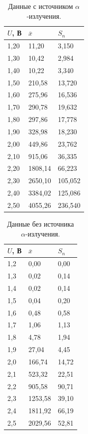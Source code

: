 \documentclass[a4paper,12pt]{article}
\begin{document}
\begin{table}[!ht]
    \centering
    \begin{tabular}{|l|l|l|}
    \hline
        $U$, В & $\overline{x}$ & $S_n$ \\ \hline
        1,20 & 11,20 & 3,150 \\ \hline
        1,30 & 10,42 & 2,984 \\ \hline
        1,40 & 10,22 & 3,340 \\ \hline
        1,50 & 210,58 & 13,720 \\ \hline
        1,60 & 275,96 & 16,536 \\ \hline
        1,70 & 290,78 & 19,632 \\ \hline
        1,80 & 297,86 & 17,778 \\ \hline
        1,90 & 328,98 & 18,230 \\ \hline
        2,00 & 449,86 & 23,762 \\ \hline
        2,10 & 915,06 & 36,335 \\ \hline
        2,20 & 1808,14 & 66,223 \\ \hline
        2,30 & 2650,10 & 105,052 \\ \hline
        2,40 & 3384,02 & 125,086 \\ \hline
        2,50 & 4055,26 & 236,540 \\ \hline
    \end{tabular}
    \caption{Данные с источником $\alpha$-излучения.}
\end{table}

\begin{table}[!ht]
    \centering
    \begin{tabular}{|l|l|l|}
    \hline
        $U$, В & $\overline{x}$ & $S_n$ \\ \hline
        1,2 & 0,00 & 0,00 \\ \hline
        1,3 & 0,02 & 0,14 \\ \hline
        1,4 & 0,02 & 0,14 \\ \hline
        1,5 & 0,04 & 0,20 \\ \hline
        1,6 & 0,48 & 0,58 \\ \hline
        1,7 & 1,06 & 1,13 \\ \hline
        1,8 & 4,78 & 1,94 \\ \hline
        1,9 & 27,04 & 4,45 \\ \hline
        2,0 & 166,74 & 14,72 \\ \hline
        2,1 & 523,32 & 22,51 \\ \hline
        2,2 & 905,58 & 90,71 \\ \hline
        2,3 & 1253,58 & 39,10 \\ \hline
        2,4 & 1811,92 & 66,19 \\ \hline
        2,5 & 2029,56 & 52,81 \\ \hline
    \end{tabular}
    \caption{Данные без источника $\alpha$-излучения.}
\end{table}
\end{document}

